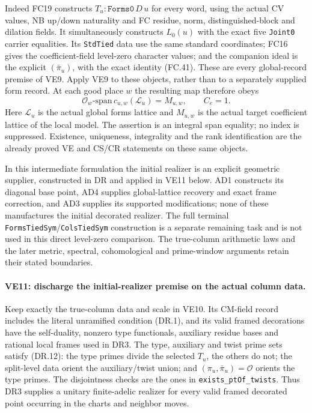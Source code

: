 \documentclass[11pt,a4paper]{article}
\numberwithin{equation}{section}
\theoremstyle{remark}\newtheorem{remark}[theorem]{Remark}
\begin{document}
Indeed FC19 constructs $T_u:\texttt{Forms0}\,D\,u$ for every
word, using the actual CV values, NB up/down naturality and FC residue,
norm, distinguished-block and dilation fields. It simultaneously
constructs $L_0(u)$ with the exact five \texttt{Joint0} carrier
equalities. Its \texttt{StdTied} data use the same standard coordinates;
FC16 gives the coefficient-field level-zero character values; and
the companion ideal is the explicit $(\bar\pi_u)$, with the exact
identity (FC.41). These are every global-record premise of VE9.
Apply VE9 to these objects, rather than to a separately supplied
form record. At each good place $w$ the resulting map therefore obeys
\[
 \mathcal O_w\text{-span}\,
          c_{u,w}(\mathcal L_u)=M_{u,w},\qquad C_e=1. \tag{VE.15}
\]
Here $\mathcal L_u$ is the actual global forms lattice and $M_{u,w}$
is the actual target coefficient lattice of the local model. The
assertion is an integral span equality; no index is suppressed.
Existence, uniqueness, integrality and the rank identification are
the already proved VE and CS/CR statements on these same objects.

In this intermediate formulation the initial realizer is an explicit
geometric supplier, constructed in DR and applied in VE11 below. AD1
constructs its diagonal base point, AD4 supplies global-lattice
recovery and exact frame correction, and AD3 supplies its supported
modifications; none of these manufactures the initial decorated
realizer. The full terminal \texttt{FormsTiedSym}/\texttt{ColsTiedSym}
construction is a separate remaining task and is not used in this
direct level-zero comparison. The true-column arithmetic laws and
the later metric, spectral, cohomological and prime-window arguments
retain their stated boundaries.

\paragraph{VE11: discharge the initial-realizer premise on the actual column data.}
Keep exactly the true-column data and scale in VE10. Its CM-field
record includes the literal unramified condition (DR.1), and its
valid framed decorations have the self-duality, nonzero type
functionals, auxiliary residue bases and rational local frames used
in DR3. The type, auxiliary and twist prime sets satisfy (DR.12):
the type primes divide the selected $T_u$, the others do not;
the split-level data orient the auxiliary/twist union; and
$(\pi_u,\bar\pi_u)=\mathcal O$ orients the type primes.
The disjointness checks are the ones in
\texttt{exists\_\allowbreak ptOf\_\allowbreak twists}. Thus DR3 supplies a unitary finite-adelic
realizer for every valid framed decorated point occurring in the
charts and neighbor moves.
\end{document}
